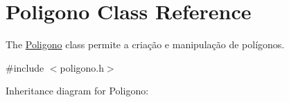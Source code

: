 \hypertarget{class_poligono}{}\section{Poligono Class Reference}
\label{class_poligono}


The \mbox{\hyperlink{class_poligono}{Poligono}} class permite a criação e manipulação de polígonos.  




{\ttfamily \#include $<$poligono.\+h$>$}



Inheritance diagram for Poligono\+:
